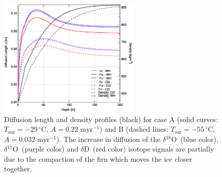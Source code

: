 \documentclass[11pt, draftcls, onecolumn]{IEEEtran} %
\numberwithin{equation}{section}
\numberwithin{table}{section}
\numberwithin{figure}{section}
\newcommand{\delOx}{$\delta{}^{18}\mathrm{O}$}
\newcommand{\delOxb}{$\delta{}^{17}\mathrm{O}$}
\newcommand{\delD}{$\delta\mathrm{D}$}
\begin{document}
\begin{figure}[]	
\vspace*{2mm}
	\begin{center}
			\includegraphics[width=0.6\textwidth]{Figure_1}
			\caption{Diffusion length and density profiles (black) for case A (solid curves: $T_{\mathrm{sur}} = -29 \,^{\circ} \mathrm{C}$,
				 $A = 0.22 \;\mathrm{myr^{-1}}$) and B (dashed lines: $T_{\mathrm{sur}} = -55 \,^{\circ} \mathrm{C}$,
				$A = 0.032 \;\mathrm{myr^{-1}}$). 
				The increase in diffusion of the \delOx~(blue color), \delOxb~(purple color) and \delD~(red color) isotope signals are
				partially due to the compaction of the firn which moves the ice closer together. } 		
	\label{fig:diffusion_length_profiles}		
		\end{center}

\end{figure}

\end{document}
